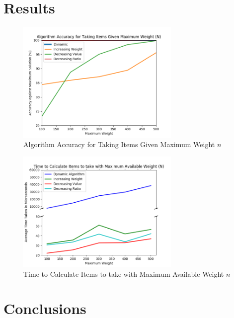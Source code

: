\documentclass[10pt, letterpaper]{article}
\begin{document}
\section{Results}
	\begin{figure}[htbp]
		\begin{center}
			\includegraphics[width=0.70\textwidth]{python/accuracyGraph.png}
			\caption{Algorithm Accuracy for Taking Items Given Maximum Weight $n$}
			\label{fig:accuracy-graph}
		\end{center}
	\end{figure}
	\begin{figure}[htbp]
		\begin{center}
			\includegraphics[width=0.70\textwidth]{python/timeGraph.png}
			\caption{Time to Calculate Items to take with Maximum Available Weight $n$}
			\label{fig:time-graph}
		\end{center}
	\end{figure}
\section{Conclusions}
\end{document}
